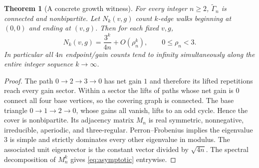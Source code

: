 \documentclass[11pt]{article}
\newtheorem{theorem}{Theorem}[section]
\begin{document}
\begin{theorem}[A concrete growth witness]\label{thm:growth}
For every integer $n\ge2$, $\widetilde\Gamma_n$ is connected and nonbipartite. Let $N_k(v,g)$ count $k$-edge walks beginning at $(0,0)$ and ending at $(v,g)$. Then for each fixed $v,g$,
\begin{equation}\label{eq:asymptotic}
N_k(v,g)=\frac{3^k}{4n}+O(\rho_n^k), \qquad 0\le\rho_n<3.
\end{equation}
In particular all $4n$ endpoint/gain counts tend to infinity \emph{simultaneously} along the entire integer sequence $k\to\infty$.
\end{theorem}
\begin{proof}
The path $0\to2\to3\to0$ has net gain $1$ and therefore its lifted repetitions reach every gain sector. Within a sector the lifts of paths whose net gain is $0$ connect all four base vertices, so the covering graph is connected. The base triangle $0\to1\to2\to0$, whose gains all vanish, lifts to an odd cycle. Hence the cover is nonbipartite. Its adjacency matrix $M_n$ is real symmetric, nonnegative, irreducible, aperiodic, and three-regular. Perron--Frobenius implies the eigenvalue $3$ is simple and strictly dominates every other eigenvalue in modulus. The associated unit eigenvector is the constant vector divided by $\sqrt{4n}$. The spectral decomposition of $M_n^k$ gives \eqref{eq:asymptotic} entrywise.
\end{proof}
\end{document}
